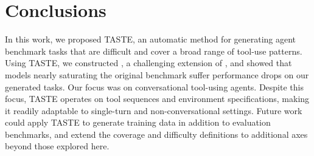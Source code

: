 \section{Conclusions}

In this work, we proposed TASTE, an automatic method for generating agent benchmark tasks that are difficult and cover a broad range of tool-use patterns. Using TASTE, we constructed \ourbenchmark, a challenging extension of \taubench, and showed that models nearly saturating the original benchmark suffer performance drops on our generated tasks. Our focus was on conversational tool-using agents. Despite this focus, TASTE operates on tool sequences and environment specifications, making it readily adaptable to single-turn and non-conversational settings. Future work could apply TASTE to generate training data in addition to evaluation benchmarks, and extend the coverage and difficulty definitions to additional axes beyond those explored here.